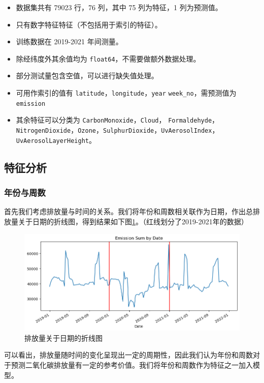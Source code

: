 \documentclass{ctexart}
\begin{document}
\begin{itemize}
      \item 数据集共有 79023 行，76 列，其中 75 列为特征，1 列为预测值。
      \item 只有数字特征特征（不包括用于索引的特征）。
      \item 训练数据在 2019-2021 年间测量。%
      \item 除经纬度外其余值均为 \texttt{float64}，不需要做额外数据处理。
      \item 部分测试量包含空值，可以进行缺失值处理。
      \item 可用作索引的值有 \texttt{latitude}，\texttt{longitude}，\texttt{year} \texttt{week\_no}，需预测值为 \texttt{emission}
      \item 其余特征可以分类为 \texttt{CarbonMonoxide}，\texttt{Cloud}， \texttt{Formaldehyde}，\texttt{NitrogenDioxide}，\texttt{Ozone}，\texttt{SulphurDioxide}，\texttt{UvAerosolIndex}，\texttt{UvAerosolLayerHeight}。
\end{itemize}

\subsection{特征分析}

\subsubsection{年份与周数}

首先我们考虑排放量与时间的关系。我们将年份和周数相关联作为日期，作出总排放量关于日期的折线图，得到结果如下图\ref{fig:2}。（红线划分了2019-2021年的数据）

\begin{figure}[H]
      \centering
      \includegraphics[width=1\textwidth]{output2.png}
      \caption{\label{fig:2}排放量关于日期的折线图}
\end{figure}

可以看出，排放量随时间的变化呈现出一定的周期性，因此我们认为年份和周数对于预测二氧化碳排放量有一定的参考价值。我们将年份和周数作为特征之一加入模型。
\end{document}
